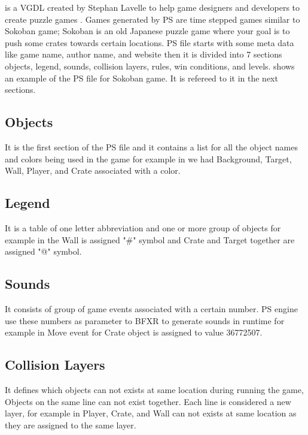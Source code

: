  is a VGDL created by Stephan Lavelle to help game designers and developers to create puzzle games \cite{puzzleScript}. Games generated by PS are time stepped games similar to Sokoban game; Sokoban is an old Japanese puzzle game where your goal is to push some crates towards certain locations\cite{sokoban}. PS file starts with some meta data like game name, author name, and website then it is divided into 7 sections objects, legend, sounds, collision layers, rules, win conditions, and levels.  shows an example of the PS file for Sokoban game. It is refereed to it in the next sections.
\subsection{Objects}
It is the first section of the PS file and it contains a list for all the object names and colors being used in the game for example in  we had Background, Target, Wall, Player, and Crate associated with a color.
\subsection{Legend}
It is a table of one letter abbreviation and one or more group of objects for example in  the Wall is assigned "\#" symbol and Crate and Target together are assigned "@" symbol.
\subsection{Sounds}
It consists of group of game events associated with a certain number. PS engine use these numbers as parameter to BFXR to generate sounds in runtime\cite{bfxr} for example in  Move event for Crate object is assigned to value 36772507.
\subsection{Collision Layers}
It defines which objects can not exists at same location during running the game, Objects on the same line can not exist together. Each line is considered a new layer, for example in  Player, Crate, and Wall can not exists at same location as they are assigned to the same layer.
